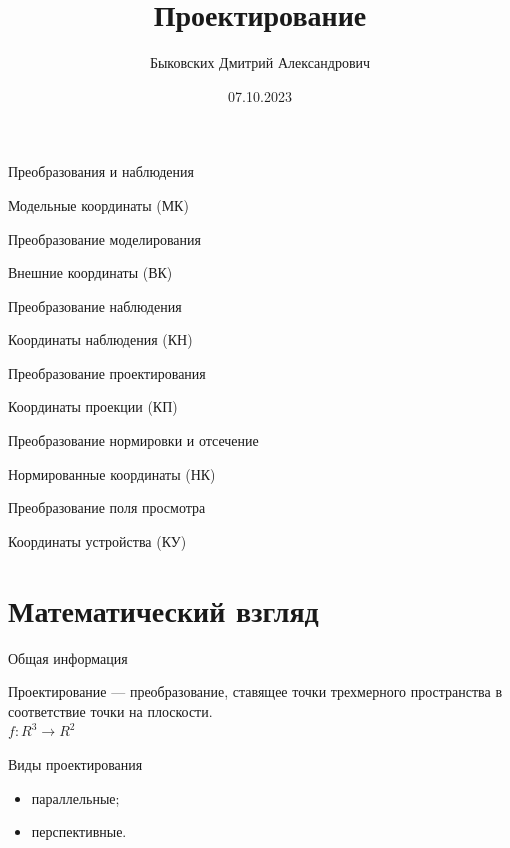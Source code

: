 \documentclass{beamer}
\title[Проектирование]{Проектирование}
\author[Быковских Д.А.]{Быковских Дмитрий Александрович}
\date{07.10.2023}
\begin{document}
	\begin{frame}
		\titlepage
	\end{frame}

	\begin{frame}{Преобразования и наблюдения}

		{\hfill
		Модельные координаты (МК)
		}
		
		Преобразование моделирования
		
		{\hfill
		Внешние координаты (ВК)
		}

		Преобразование наблюдения

		{\hfill
		Координаты наблюдения (КН)
		}

		Преобразование проектирования
		
		{\hfill
		Координаты проекции (КП)
		}
		
		Преобразование нормировки и отсечение
		
		{\hfill
		Нормированные координаты (НК)
		}

		Преобразование поля просмотра
		
		{\hfill
		Координаты устройства (КУ)
		}				
	\end{frame}

	\section{Математический взгляд}

	\begin{frame}{Общая информация}
		
		Проектирование --- преобразование, ставящее точки трехмерного пространства 
		в соответствие точки на плоскости. \\
		$f: R^3 \to R^2$
		
		Виды проектирования
		\begin{itemize}
			\item параллельные;
			\item перспективные.
		\end{itemize}

	\end{frame}
\end{document}
